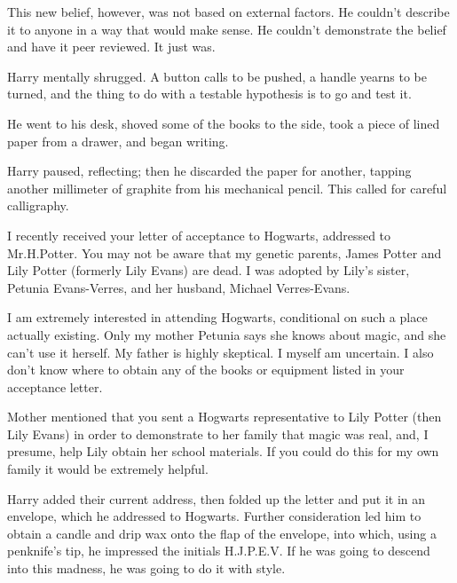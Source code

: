 This new belief, however, was not based on external factors. He couldn't describe it to anyone in a way that would make sense. He couldn't demonstrate the belief and have it peer reviewed. It just was.

Harry mentally shrugged. A button calls to be pushed, a handle yearns to be turned, and the thing to do with a testable hypothesis is to go and test it.

He went to his desk, shoved some of the books to the side, took a piece of lined paper from a drawer, and began writing.

\begin{writtenNote}
\end{writtenNote}

Harry paused, reflecting; then he discarded the paper for another, tapping another millimeter of graphite from his mechanical pencil. This called for careful calligraphy.

\pagebreak%
\begin{writtenNote}


I recently received your letter of acceptance to Hogwarts, addressed to Mr.\?H.\?Potter. You may not be aware that my genetic parents, James Potter and Lily Potter (formerly Lily Evans) are dead. I was adopted by Lily's sister, Petunia Evans-Verres, and her husband, Michael Verres-Evans.

I am extremely interested in attending Hogwarts, conditional on such a place actually existing. Only my mother Petunia says she knows about magic, and she can't use it herself. My father is highly skeptical. I myself am uncertain. I also don't know where to obtain any of the books or equipment listed in your acceptance letter.

Mother mentioned that you sent a Hogwarts representative to Lily Potter (then Lily Evans) in order to demonstrate to her family that magic was real, and, I presume, help Lily obtain her school materials. If you could do this for my own family it would be extremely helpful.

\end{writtenNote}

Harry added their current address, then folded up the letter and put it in an envelope, which he addressed to Hogwarts. Further consideration led him to obtain a candle and drip wax onto the flap of the envelope, into which, using a penknife's tip, he impressed the initials H.J.P.E.V\@. If he was going to descend into this madness, he was going to do it with style.

